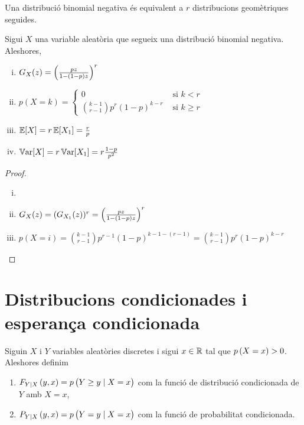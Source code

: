 \begin{obs}
    Una distribució binomial negativa és equivalent a $r$ distribucions geomètriques seguides.
\end{obs}


\begin{prop}
    Sigui $X$ una variable aleatòria que segueix una distribució binomial negativa. Aleshores,
    \begin{enumerate}[i)]
        \item $G_X(z) = \left( \frac{pz}{1-\left( 1-p\right) z}\right)^r$
        \item $p(X=k) = \begin{cases}
                         0 &\text{ si } k < r\\
                         \binom{k-1}{r-1}p^{r}(1-p)^{k-r} & \text{ si }k\geq r
                        \end{cases}$
        \item $\operatorname{\mathbb{E}}[X] = r\operatorname{\mathbb{E}}[X_1] = \frac{r}{p}$
        \item $\operatorname{\mathbb{V}ar}[X] = r\operatorname{\mathbb{V}ar}[X_1] = r\frac{1-p}{p^2}$
    \end{enumerate}
\end{prop}

\begin{proof}
    \begin{enumerate}[i)]
        \item[]
        \item $G_X(z) = (G_{X_1}(z))^r = \left( \frac{pz}{1-\left( 1-p\right) z}\right)^r$
        \item $p(X=i) = \binom{k-1}{r-1}p^{r-1}(1-p)^{k-1-(r-1)} = \binom{k-1}{r-1}p^{r}(1-p)^{k-r}$
    \end{enumerate}
\end{proof}

\section{Distribucions condicionades i esperança condicionada}

\begin{defi}
Siguin $X$ i $Y$ variables aleatòries discretes i sigui $x\in\mathbb{R}$ tal que $p\left( X=x\right) >0$. Aleshores definim
    \begin{enumerate}[1)]
        \item $F_{Y\vert X} \left( y,x\right)=p\left( Y\geq y\mid X=x \right)$ com la funció de distribució condicionada de $Y$ amb $X=x$,
        \item $P_{Y\vert X} \left( y,x\right)=p\left( Y = y\mid X=x \right)$ com la funció de probabilitat condicionada.
    \end{enumerate} 
\end{defi}

